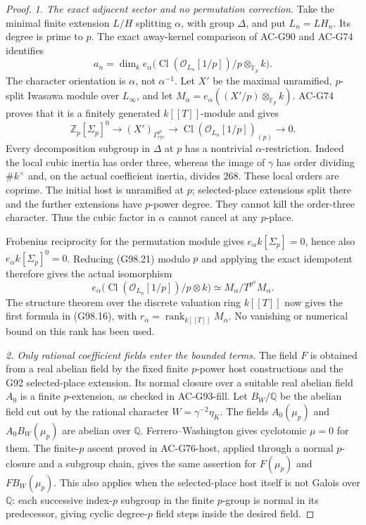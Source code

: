 \begin{proof}
\emph{1. The exact adjacent sector and no permutation correction.}
Take the minimal finite extension $L/H$ splitting $\alpha$,
with group $\Delta$, and put $L_n=LH_n$.
Its degree is prime to $p$.  The exact away-kernel comparison
of AC-G90 and AC-G74 identifies
\[
 a_n=\dim_k e_\alpha
       \bigl(\operatorname{Cl}(\mathcal O_{L_n}[1/p])/p
                                  \otimes_{\mathbb F_p}k\bigr).
 \tag{G98.20}
\]
The character orientation is $\alpha$, not $\alpha^{-1}$.
Let $X'$ be the maximal unramified, $p$-split Iwasawa module
over $L_\infty$, and let
$M_\alpha=e_\alpha((X'/p)\otimes_{\mathbb F_p}k)$.
AC-G74 proves that it is a finitely generated $k[[T]]$-module and gives
\[
 \mathbb Z_p[\Sigma_p]^0\longrightarrow
       (X')_{\Gamma_{\mathrm{cyc}}^{p^n}}
       \longrightarrow
       \operatorname{Cl}(\mathcal O_{L_n}[1/p])_{(p)}
       \longrightarrow0.
 \tag{G98.21}
\]
Every decomposition subgroup in $\Delta$ at $p$ has a
nontrivial $\alpha$-restriction.  Indeed the local cubic
inertia has order three, whereas the image of $\gamma$ has
order dividing $\#k^\times$ and, on the actual coefficient
inertia, divides $268$.  These local orders are coprime.
The initial host is unramified at $p$; selected-place extensions
split there and the further extensions have $p$-power degree.
They cannot kill the order-three character.
Thus the cubic factor in $\alpha$ cannot cancel at any $p$-place.

Frobenius reciprocity for the permutation module gives
$e_\alpha k[\Sigma_p]=0$, hence also
$e_\alpha k[\Sigma_p]^0=0$.
Reducing (G98.21) modulo $p$ and applying the exact idempotent
therefore gives the actual isomorphism
\[
 e_\alpha\bigl(\operatorname{Cl}(\mathcal O_{L_n}[1/p])/p
                                     \otimes k\bigr)
                 \simeq M_\alpha/T^{p^n}M_\alpha.
 \tag{G98.22}
\]
The structure theorem over the discrete valuation ring $k[[T]]$
now gives the first formula in (G98.16), with
$r_\alpha=\operatorname{rank}_{k[[T]]}M_\alpha$.
No vanishing or numerical bound on this rank has been used.

\emph{2. Only rational coefficient fields enter the bounded terms.}
The field $F$ is obtained from a real abelian field by the fixed
finite $p$-power host constructions and the G92 selected-place
extension.  Its normal closure over a suitable real abelian
field $A_0$ is a finite $p$-extension, as checked in AC-G93-fill.
Let $B_W/\mathbb Q$ be the abelian field cut out by the rational
character $W=\gamma^{-2}\eta_K$.
The fields $A_0(\mu_p)$ and $A_0B_W(\mu_p)$ are abelian
over $\mathbb Q$.
Ferrero--Washington gives cyclotomic $\mu=0$ for them.
The finite-$p$ ascent proved in AC-G76-host, applied through a
normal $p$-closure and a subgroup chain, gives the same assertion
for $F(\mu_p)$ and $FB_W(\mu_p)$.
This also applies when the selected-place host itself is not
Galois over $\mathbb Q$: each successive index-$p$ subgroup
in the finite $p$-group is normal in its predecessor, giving
cyclic degree-$p$ field steps inside the desired field.


\end{proof}
